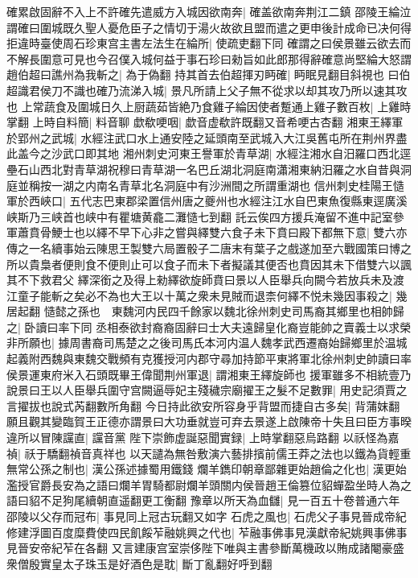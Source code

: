 確累啟固辭不入上不許確先遣威方入城因欲南奔|{
	確盖欲南奔荆江二鎮}
邵陵王綸泣謂確曰圍城既久聖人憂危臣子之情切于湯火故欲且盟而遣之更申後計成命已决何得拒違時臺使周石珍東宫主書左法生在綸所|{
	使疏吏翻下同}
確謂之曰侯景雖云欲去而不解長圍意可見也今召僕入城何益于事石珍曰勑旨如此郎那得辭確意尚堅綸大怒謂趙伯超曰譙州為我斬之|{
	為于偽翻}
持其首去伯超揮刃眄確|{
	眄眠見翻目斜視也}
曰伯超識君侯刀不識也確乃流涕入城|{
	景凡所請上父子無不從求以却其攻乃所以速其攻也}
上常蔬食及圍城日久上厨蔬茹皆絶乃食雞子綸因使者蹔通上雞子數百枚|{
	上雞時掌翻}
上時自料簡|{
	料音聊}
歔欷哽咽|{
	歔音虚欷許既翻又音希哽古杏翻}
湘東王繹軍於郢州之武城|{
	水經注武口水上通安陸之延頭南至武城入大江吳舊屯所在荆州界盡此盖今之沙武口即其地}
湘州刺史河東王譽軍於青草湖|{
	水經注湘水自汨羅口西北逕壘石山西北對青草湖祝穆曰青草湖一名巴丘湖北洞庭南瀟湘東納汨羅之水自昔與洞庭並稱按一湖之内南名青草北名洞庭中有沙洲間之所謂重湖也}
信州刺史桂陽王慥軍於西峽口|{
	五代志巴東郡梁置信州唐之夔州也水經注江水自巴東魚復縣東逕廣溪峡斯乃三峡首也峡中有瞿塘黄龕二灘慥七到翻}
託云俟四方援兵淹留不進中記室參軍蕭賁骨鯁士也以繹不早下心非之嘗與繹雙六食子未下賁曰殿下都無下意|{
	雙六亦傳之一名續事始云陳思王製雙六局置骰子二唐末有葉子之戲遂加至六戰國策曰博之所以貴梟者便則食不便則止可以食子而未下者擬議其便否也賁因其未下借雙六以諷其不下救君父}
繹深銜之及得上勑繹欲旋師賁曰景以人臣舉兵向闕今若放兵未及渡江童子能斬之矣必不為也大王以十萬之衆未見賊而退柰何繹不悦未幾因事殺之|{
	幾居起翻}
慥懿之孫也　東魏河内民四千餘家以魏北徐州刺史司馬裔其鄉里也相帥歸之|{
	卧讀曰率下同}
丞相泰欲封裔裔固辭曰士大夫遠歸皇化裔豈能帥之賣義士以求榮非所願也|{
	據周書裔司馬楚之之後司馬氏本河内温人魏孝武西遷裔始歸鄉里於温城起義附西魏與東魏交戰頻有克獲授河内郡守尋加持節平東將軍北徐州刺史帥讀曰率}
侯景運東府米入石頭既畢王偉聞荆州軍退|{
	謂湘東王繹旋師也}
援軍雖多不相統壹乃說景曰王以人臣舉兵圍守宫闕逼辱妃主殘穢宗廟擢王之髮不足數罪|{
	用史記須賈之言擢拔也說式芮翻數所角翻}
今日持此欲安所容身乎背盟而捷自古多矣|{
	背蒲妺翻}
願且觀其變臨賀王正德亦謂景曰大功垂就豈可弃去景遂上啟陳帝十失且曰臣方事暌違所以冒陳讜直|{
	讜音黨}
陛下崇飾虚誕惡聞實録|{
	上時掌翻惡烏路翻}
以祅怪為嘉禎|{
	祅于驕翻禎音真祥也}
以天譴為無咎敷演六藝排擯前儒王莽之法也以鐵為貨輕重無常公孫之制也|{
	漢公孫述據蜀用鐵錢}
爛羊鐫印朝章鄙雜更始趙倫之化也|{
	漢更始濫授官爵長安為之語曰爛羊胃騎都尉爛羊頭關内侯晉趙王倫篡位貂蟬盈坐時人為之語曰貂不足狗尾續朝直遥翻更工衡翻}
豫章以所天為血讎|{
	見一百五十卷普通六年}
邵陵以父存而冠布|{
	事見同上冠古玩翻又如字}
石虎之風也|{
	石虎父子事見晉成帝紀}
修建浮圖百度糜費使四民飢餒苲融姚興之代也|{
	苲融事佛事見漢獻帝紀姚興事佛事見晉安帝紀苲在各翻}
又言建康宫室崇侈陛下唯與主書參斷萬機政以賄成諸閹豪盛衆僧殷實皇太子珠玉是好酒色是耽|{
	斷丁亂翻好呼到翻}
